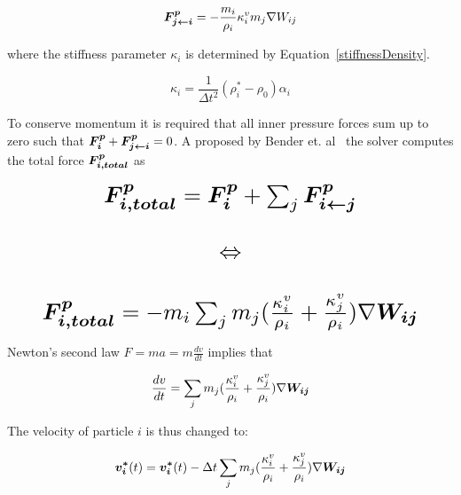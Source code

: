     \begin{equation} \label{eq:pressure2}
        \bm{F_{j\leftarrow i}^p} = -\frac{m_i}{\rho_i} \kappa_i^v m_j \nabla W_{ij}
    \end{equation}

    where the stiffness parameter $\kappa_i$ is determined by Equation~\ref{stiffnessDensity}.

    \begin{equation} \label{stiffnessDensity}
    \kappa_i = \frac{1}{\Delta t^2}(\rho_i^*-\rho_0)\alpha_i
    \end{equation}

    To conserve momentum it is required that all inner pressure forces sum up to zero such that $\bm{F_i^p} + \bm{F_{j\leftarrow i}^p} = 0$. A proposed by Bender et. al~\cite{bender} the solver computes the total force $\bm{F_{i,total}^p}$ as

    \begin{equation} \label{eq:pressureTotal}
        \resizebox{0.88\linewidth}{!}{$
        \begin{matrix}
            \vect{F_{i,total}^p} = \vect{F_i^p} + \sum_j \vect{F_{i\leftarrow j}^p} \\
            \\
            \Leftrightarrow \\ 
            \\
            \vect{F_{i,total}^p} = -m_i \sum_j m_j (\frac{\kappa_i^v}{\rho_i} + \frac{\kappa_j^v}{\rho_i}) \nabla \vect{W_{ij}}
        \end{matrix}
        $}
    \end{equation}

    Newton's second law $F = ma = m\frac{dv}{dt}$ implies that 

    \begin{equation} \label{dvdt}
        \frac{dv}{dt} = \sum_j m_j (\frac{\kappa_i^v}{\rho_i} + \frac{\kappa_j^v}{\rho_i}) \nabla \bm{W_{ij}}
    \end{equation}

    The velocity of particle $i$ is thus changed to:

    \begin{equation} \label{eq:velocity}
        \bm{v_i^*}(t) = \bm{v_i^*}(t) - \Delta t \sum_j m_j (\frac{\kappa_i^v}{\rho_i} + \frac{\kappa_j^v}{\rho_i}) \nabla \bm{W_{ij}}
    \end{equation}



